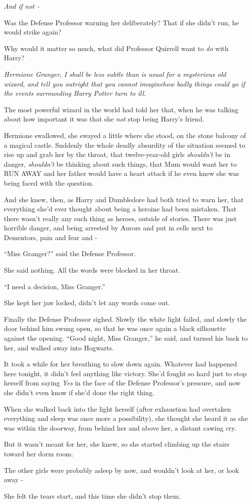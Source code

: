 \emph{And if not -}

Was the Defense Professor warning her deliberately? That if she didn't
run, he would strike again?

Why would it matter so much, what did Professor Quirrell want to
\emph{do} with Harry?

\emph{Hermione Granger, I shall be less subtle than is usual for a
mysterious old wizard, and tell you outright that you cannot}
\emph{imagine}\emph{how badly things could go if the events surrounding
Harry Potter turn to ill.}

The most powerful wizard in the world had told her that, when he was
talking about how important it was that she \emph{not} stop being
Harry's friend.

Hermione swallowed, she swayed a little where she stood, on the stone
balcony of a magical castle. Suddenly the whole deadly absurdity of the
situation seemed to rise up and grab her by the throat, that
twelve-year-old girls \emph{shouldn't} be in danger, \emph{shouldn't} be
thinking about such things, that Mum would want her to RUN AWAY and her
father would have a heart attack if he even knew she was being faced
with the question.

And she knew, then, as Harry and Dumbledore had both tried to warn her,
that everything she'd ever thought about being a heroine had been
mistaken. That there wasn't really any such thing as heroes, outside of
stories. There was just horrible danger, and being arrested by Aurors
and put in cells next to Dementors, pain and fear and -

``Miss Granger?'' said the Defense Professor.

She said nothing. All the words were blocked in her throat.

``I need a decision, Miss Granger.''

She kept her jaw locked, didn't let any words come out.

Finally the Defense Professor sighed. Slowly the white light failed, and
slowly the door behind him swung open, so that he was once again a black
silhouette against the opening. ``Good night, Miss Granger,'' he said,
and turned his back to her, and walked away into Hogwarts.

It took a while for her breathing to slow down again. Whatever had
happened here tonight, it didn't feel anything like victory. She'd
fought so hard just to stop herself from saying \emph{Yes} in the face
of the Defense Professor's pressure, and now she didn't even know if
she'd done the right thing.

When she walked back into the light herself (after exhaustion had
overtaken everything and sleep was once more a possibility), she thought
she heard it as she was within the doorway, from behind her and above
her, a distant cawing cry.

But it wasn't meant for her, she knew, so she started climbing up the
stairs toward her dorm room.

The other girls were probably asleep by now, and wouldn't look at her,
or look away -

She felt the tears start, and this time she didn't stop them.

